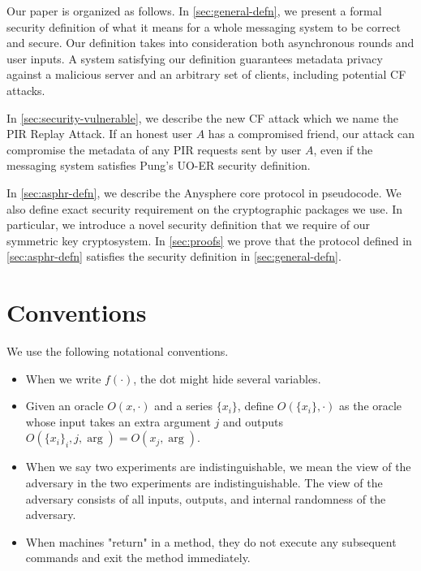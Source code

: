 Our paper is organized as follows. In \cref{sec:general-defn}, we present a formal security definition of what it means for a whole messaging system to be correct and secure. Our definition takes into consideration both asynchronous rounds and user inputs. A system satisfying our definition guarantees metadata privacy against a malicious server and an arbitrary set of clients, including potential CF attacks.

In \cref{sec:security-vulnerable}, we describe the new CF attack which we name the PIR Replay Attack. If an honest user $A$ has a compromised friend, our attack can compromise the metadata of any PIR requests sent by user $A$, even if the messaging system satisfies Pung's UO-ER security definition. 

In \cref{sec:asphr-defn}, we describe the Anysphere core protocol in pseudocode. We also define exact security requirement on the cryptographic packages we use. In particular, we introduce a novel security definition that we require of our symmetric key cryptosystem. In \cref{sec:proofs} we prove that the protocol defined in \cref{sec:asphr-defn} satisfies the security definition in \cref{sec:general-defn}.



\section{Conventions}
We use the following notational conventions.
\begin{itemize}
    \item When we write $f(\cdot)$, the dot might hide several variables.
    
    \item Given an oracle $O(x, \cdot)$ and a series $\{x_i\}$, define $O(\{x_i\}, \cdot)$ as the oracle whose input takes an extra argument $j$ and outputs $O(\{x_i\}_i, j, \arg) = O(x_j, \arg)$.

    \item When we say two experiments are indistinguishable, we mean the view of the adversary in the two experiments are indistinguishable. The view of the adversary consists of all inputs, outputs, and internal randomness of the adversary.
    
    \item When machines "return" in a method, they do not execute any subsequent commands and exit the method immediately.
\end{itemize}
